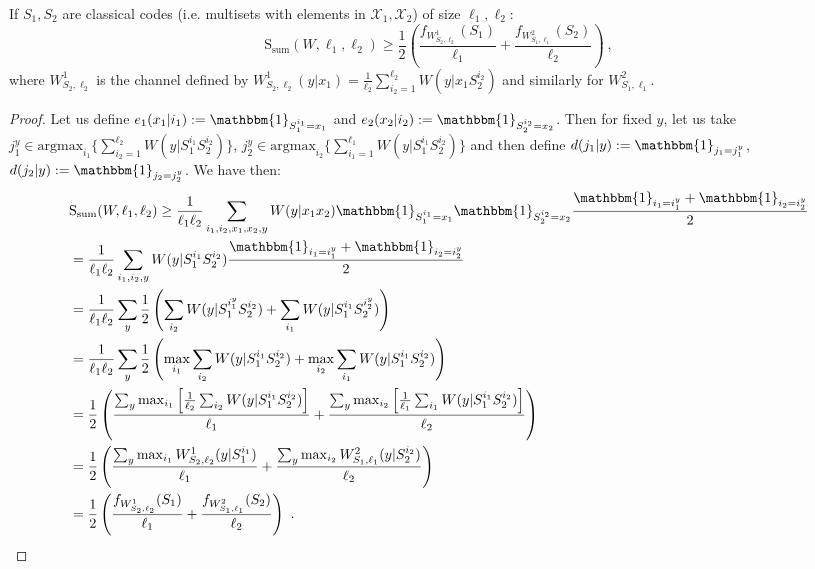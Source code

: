 \begin{lemma}
  \label{lem:DoubleOneWay}
  If $S_1,S_2$ are classical codes (i.e. multisets with elements in $\mathcal{X}_1,\mathcal{X}_2$) of size $\ell_1,\ell_2$:
  \[ \mathrm{S}_{\text{sum}}(W,\ell_1,\ell_2) \geq \frac{1}{2}\left(\frac{f_{W^1_{S_2,\ell_2}}(S_1)}{\ell_1} + \frac{f_{W^2_{S_1,\ell_1}}(S_2)}{\ell_2}\right) \ ,\]
  where $W^1_{S_2, \ell_2}$ is the channel defined by $W^1_{S_2, \ell_2}(y|x_1) = \frac{1}{\ell_2} \sum_{i_2 = 1}^{\ell_2} W(y|x_1S_2^{i_2})$ and similarly for $W^2_{S_1, \ell_1}$.
\end{lemma}
\begin{proof}
  Let us define $e_1(x_1|i_1) := \mathbbm{1}_{S_1^{i_1}=x_1}$ and $e_2(x_2|i_2) := \mathbbm{1}_{S_2^{i_2}=x_2}$. Then for fixed $y$, let us take $j_1^y \in \text{argmax}_{i_1} \{\sum_{i_2 = 1}^{\ell_2}W(y|S_1^{i_1}S_2^{i_2})\}$, $j_2^y \in \text{argmax}_{i_2}\{\sum_{i_1 = 1}^{\ell_1}W(y|S_1^{i_1}S_2^{i_2})\}$ and then define $d(j_1|y) := \mathbbm{1}_{j_1=j_1^y}$, $d(j_2|y) := \mathbbm{1}_{j_2=j_2^y}$. We have then:
  \begin{equation}
    \begin{aligned}
      &\mathrm{S}_{\text{sum}}(W,\ell_1,\ell_2) \geq \frac{1}{\ell_1\ell_2}\sum_{i_1,i_2,x_1,x_2,y}W(y|x_1x_2)\mathbbm{1}_{S_1^{i_1}=x_1}\mathbbm{1}_{S_2^{i_2}=x_2}\frac{\mathbbm{1}_{i_1=i_1^y}+\mathbbm{1}_{i_2=i_2^y}}{2}\\
      &= \frac{1}{\ell_1\ell_2}\sum_{i_1,i_2,y}W(y|S_1^{i_1}S_2^{i_2})\frac{\mathbbm{1}_{i_1=i_1^y}+\mathbbm{1}_{i_2=i_2^y}}{2}\\
      &= \frac{1}{\ell_1\ell_2}\sum_{y}\frac{1}{2}\left(\sum_{i_2}W(y|S_1^{i_1^y}S_2^{i_2}) + \sum_{i_1}W(y|S_1^{i_1}S_2^{i_2^y})\right)\\
      &= \frac{1}{\ell_1\ell_2}\sum_{y}\frac{1}{2}\left(\max_{i_1}\sum_{i_2}W(y|S_1^{i_1}S_2^{i_2}) + \max_{i_2}\sum_{i_1}W(y|S_1^{i_1}S_2^{i_2})\right)\\
      &= \frac{1}{2}\left(\frac{\sum_{y}\max_{i_1}\left[\frac{1}{\ell_2}\sum_{i_2} W(y|S_1^{i_1}S_2^{i_2})\right]}{\ell_1} + \frac{\sum_{y}\max_{i_2}\left[\frac{1}{\ell_1}\sum_{i_1} W(y|S_1^{i_1}S_2^{i_2})\right]}{\ell_2} \right)\\
      &= \frac{1}{2}\left(\frac{\sum_{y}\max_{i_1}W^1_{S_2,\ell_2}(y|S_1^{i_1})}{\ell_1} + \frac{\sum_{y}\max_{i_2}W^2_{S_1,\ell_1}(y|S_2^{i_2})}{\ell_2} \right)\\
      &= \frac{1}{2}\left(\frac{f_{W^1_{S_2,\ell_2}}(S_1)}{\ell_1} + \frac{f_{W^2_{S_1,\ell_1}}(S_2)}{\ell_2}\right) \ .
    \end{aligned}
  \end{equation}
\end{proof}

